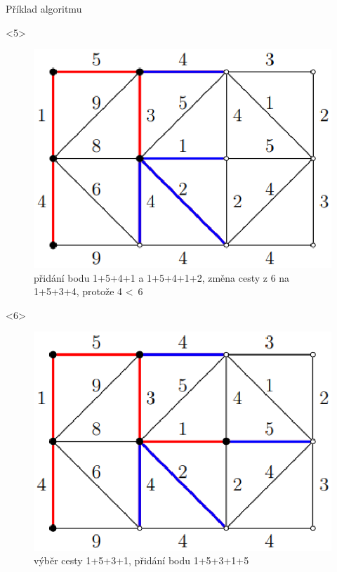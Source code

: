 \documentclass[pdf]{beamer}
\begin{document}
\begin{centering}
\begin{frame}{Příklad algoritmu}
    \begin{onlyenv}<5>
        \begin{figure}[h!]
        \includegraphics[scale=0.5]{obr5.eps}
        \caption{\label{fig:obr5}přidání bodu 1+5+4+1 a 1+5+4+1+2, změna cesty z 6 na 1+5+3+4, protože 4 \textless~6}
        \end{figure}
    \end{onlyenv}
    
    \begin{onlyenv}<6>
        \begin{figure}[h!]
        \includegraphics[scale=0.5]{obr6.eps}
        \caption{\label{fig:obr6}výběr cesty 1+5+3+1, přidání bodu 1+5+3+1+5}
        \end{figure}
    \end{onlyenv}
    

\end{frame}
\end{centering}
\end{document}
